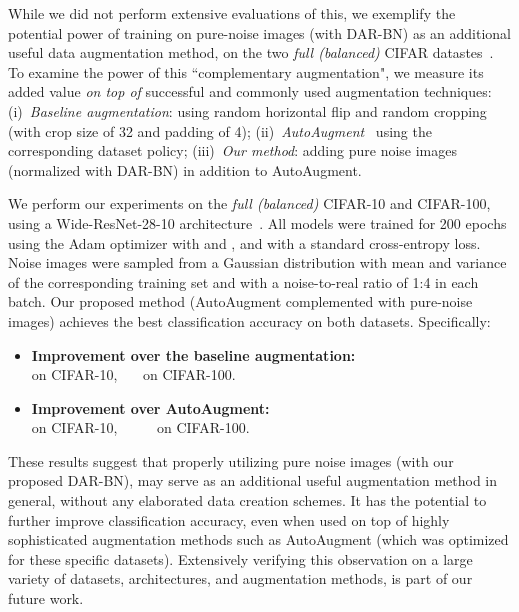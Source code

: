 \documentclass[nohyperref]{article}
\theoremstyle{plain}
\theoremstyle{definition}
\theoremstyle{remark}
\begin{document}
While we did not perform extensive evaluations of this, we exemplify the potential power of training on pure-noise images (with DAR-BN) as an additional  useful data augmentation method, on the two \emph{full (balanced)} CIFAR datastes~\cite{krizhevsky2009learning}.
To examine the power of this ``complementary augmentation", 
we measure its added value \emph{on top of} 
successful and commonly used augmentation techniques: 
(i)~\textit{Baseline augmentation}: using random horizontal flip and random cropping (with crop size of 32 and padding of 4); (ii)~\textit{AutoAugment}~\cite{cubuk2019autoaugment} using the corresponding dataset policy; (iii)~\textit{Our method}: adding pure noise images (normalized with DAR-BN) in addition to AutoAugment.

We perform our experiments on the \emph{full (balanced)} CIFAR-10 and CIFAR-100, using a Wide-ResNet-28-10 architecture~\cite{zagoruyko2016wide}. All models were trained for 200 epochs using the Adam optimizer with  and , and with a standard cross-entropy loss. Noise images were sampled from a Gaussian distribution with mean and variance of the corresponding training set and with a noise-to-real ratio of 1:4 in each batch.
Our proposed method (AutoAugment complemented with pure-noise images) achieves the best classification accuracy on both datasets. Specifically:
\vspace{-0.1cm}
\begin{itemize}[topsep=0pt,itemsep=-1ex,partopsep=1ex,parsep=1ex,leftmargin=*]
\item{\textbf{Improvement over the baseline augmentation:}}\\
\hspace*{0.5cm}  on CIFAR-10, \ \ \   on CIFAR-100.
\item{\textbf{Improvement over AutoAugment:}} \\
\hspace*{0.5cm}  on CIFAR-10, \ \ \ \  \   on CIFAR-100. 
\end{itemize}
\vspace{-0.1cm}

\noindent 
These results suggest that 
properly utilizing pure noise images (with our proposed DAR-BN), may serve as an additional useful augmentation method in general, without any elaborated data creation schemes. It has the potential to further improve classification accuracy, even when used on top of highly sophisticated augmentation methods such as AutoAugment (which was optimized for these specific datasets).
Extensively verifying this observation on a large variety of datasets, architectures, and augmentation methods, is part of our future work.
  
\end{document}
